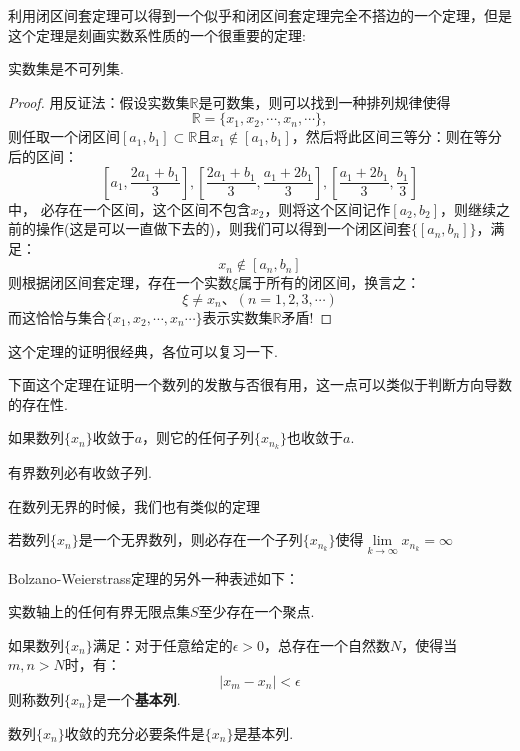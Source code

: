 	利用闭区间套定理可以得到一个似乎和闭区间套定理完全不搭边的一个定理，但是这个定理是刻画实数系性质的一个很重要的定理:
	\begin{theorem}
		实数集是不可列集.
	\end{theorem}
	\begin{proof}
		用反证法：假设实数集$\mathbb{R}$是可数集，则可以找到一种排列规律使得$$\mathbb{R}=\{x_1,x_2,\cdots,x_n,\cdots\},$$
		则任取一个闭区间$\left[a_1,b_1\right]\subset\mathbb{R}$且$x_1\notin\left[a_1,b_1\right]$，然后将此区间三等分：则在等分后的区间：$$\left[a_1,\frac{2a_1+b_1}{3}\right],\left[\frac{2a_1+b_1}{3},\frac{a_1+2b_1}{3}\right],\left[\frac{a_1+2b_1}{3},\frac{b_1}{3}\right]$$中，
		必存在一个区间，这个区间不包含$x_2$，则将这个区间记作$\left[a_2,b_2\right]$，则继续之前的操作(这是可以一直做下去的)，则我们可以得到一个闭区间套$\{\left[a_n,b_n\right]\}$，满足：
		$$x_n\notin\left[a_n,b_n\right]$$则根据闭区间套定理，存在一个实数$\xi$属于所有的闭区间，换言之：$$\xi\neq x_n、 (n=1,2,3,\cdots)$$
		而这恰恰与集合$\{x_1,x_2,\cdots,x_n\cdots\}$表示实数集$\mathbb{R}$矛盾!
	\end{proof}

	这个定理的证明很经典，各位可以复习一下.\par
	下面这个定理在证明一个数列的发散与否很有用，这一点可以类似于判断方向导数的存在性.\par
	\begin{theorem}
		如果数列$\{x_n\}$收敛于$a$，则它的任何子列$\{x_{n_k}\}$也收敛于$a$.
	\end{theorem}
	\begin{theorem}
		有界数列必有收敛子列.
	\end{theorem}

	在数列无界的时候，我们也有类似的定理
	\begin{theorem}
		若数列$\{x_n\}$是一个无界数列，则必存在一个子列$\{x_{n_k}\}$使得$\lim\limits_{k\rightarrow\infty}x_{n_k}=\infty$
	\end{theorem}

	Bolzano-Weierstrass定理的另外一种表述如下：
	\begin{theorem}
		实数轴上的任何有界无限点集$S$至少存在一个聚点.
	\end{theorem}
	\begin{definition}[基本列]
		如果数列$\{x_n\}$满足：对于任意给定的$\epsilon>0$，总存在一个自然数$N$，使得当$m,n>N$时，有：$$|x_m-x_n|<\epsilon$$则称数列$\{x_n\}$是一个\textbf{基本列}.
	\end{definition}
	\begin{theorem}[Cauchy收敛定理]
		数列$\{x_n\}$收敛的充分必要条件是$\{x_n\}$是基本列.
	\end{theorem}

